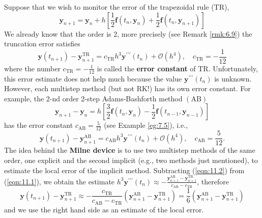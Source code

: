 \documentclass[a4paper]{article}
\begin{document}
\begin{technique}
    Suppose that we wish to monitor the error of the trapezoidal rule (TR),
\[
\mathbf{y}_{n+1}=\mathbf{y}_n+h\left[\frac{1}{2} \mathbf{f}\left(t_n, \mathbf{y}_n\right)+\frac{1}{2} \mathbf{f}\left(t_n, \mathbf{y}_{n+1}\right)\right]
\]
We already know that the order is 2, more precisely (see Remark \ref{rmk:6.9}) the truncation error satisfies
\begin{equation}\label{eqn:11.1}
    \mathbf{y}\left(t_{n+1}\right)-\mathbf{y}_{n+1}^{\mathrm{TR}}=c_{\mathrm{TR}} h^3 \mathbf{y}^{\prime \prime \prime}\left(t_n\right)+\mathcal{O}\left(h^4\right), \quad c_{\mathrm{TR}}=-\frac{1}{12}
\end{equation}
where the number $c_{\mathrm{TR}}=-\frac{1}{12}$ is called the \textbf{error constant} of TR. Unfortunately, this error estimate does not help much because the value $\mathbf{y}^{\prime \prime \prime}\left(t_n\right)$ is unknown. However, each multistep method (but not RK!) has its own error constant. For example, the 2-nd order 2-step Adams-Bashforth method $(\mathrm{AB})$
\[
\mathbf{y}_{n+1}-\mathbf{y}_n=h\left[\frac{3}{2} \mathbf{f}\left(t_n, \mathbf{y}_n\right)-\frac{1}{2} \mathbf{f}\left(t_{n-1}, \mathbf{y}_{n-1}\right)\right]
\]
has the error constant $c_{\mathrm{AB}}=\frac{5}{12}$ (see Example \ref{eg:7.5}), i.e.,
\begin{equation}\label{eqn:11.2}
    \mathbf{y}\left(t_{n+1}\right)-\mathbf{y}_{n+1}^{\mathrm{AB}}=c_{\mathrm{AB}} h^3 \mathbf{y}^{\prime \prime \prime}\left(t_n\right)+\mathcal{O}\left(h^4\right), \quad c_{\mathrm{AB}}=\frac{5}{12} .
\end{equation}
The idea behind the \textbf{Milne device} is to use two multistep methods of the same order, one explicit and the second implicit (e.g., two methods just mentioned), to estimate the local error of the implicit method. Subtracting (\ref{eqn:11.2}) from (\ref{eqn:11.1}), we obtain the estimate $h^3 \mathbf{y}^{\prime \prime \prime}\left(t_n\right) \approx-\frac{\mathbf{y}_{n+1}^{\mathrm{AB}}-\mathbf{y}_{n+1}^{\mathrm{TR}}}{c_{\mathrm{AB}}-c_{\mathrm{TR}}}$, therefore
\begin{equation}\label{eqn:11.3}
    \mathbf{y}\left(t_{n+1}\right)-\mathbf{y}_{n+1}^{\mathrm{TR}} \approx-\frac{c_{\mathrm{TR}}}{c_{\mathrm{AB}}-c_{\mathrm{TR}}}\left(\mathbf{y}_{n+1}^{\mathrm{AB}}-\mathbf{y}_{n+1}^{\mathrm{TR}}\right)=\frac{1}{6}\left(\mathbf{y}_{n+1}^{\mathrm{AB}}-\mathbf{y}_{n+1}^{\mathrm{TR}}\right)
\end{equation}
and we use the right hand side as an estimate of the local error.
\end{technique}
\end{document}
